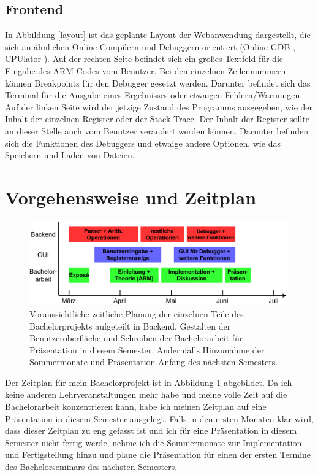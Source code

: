 \documentclass[a4paper, 11pt, onecolumn]{article}
\begin{document}
\subsection{Frontend}

In Abbildung \ref{layout} ist das geplante Layout der Webanwendung dargestellt, die sich an ähnlichen Online Compilern und Debuggern orientiert (Online GDB \cite{onlinegdb}, CPUlator \cite{cpulator}). Auf der rechten Seite befindet sich ein großes Textfeld für die Eingabe des ARM-Codes vom Benutzer. Bei den einzelnen Zeilennummern können Breakpoints für den Debugger gesetzt werden. Darunter befindet sich das Terminal für die Ausgabe eines Ergebnisses oder etwaigen Fehlern/Warnungen. Auf der linken Seite wird der jetzige Zustand des Programms ausgegeben, wie der Inhalt der einzelnen Register oder der Stack Trace. Der Inhalt der Register sollte an dieser Stelle auch vom Benutzer verändert werden können. Darunter befinden sich die Funktionen des Debuggers und etwaige andere Optionen, wie das Speichern und Laden von Dateien.


\section{Vorgehensweise und Zeitplan}

\begin{figure}[!htb]	
	\includegraphics[width=0.8\paperwidth]{data/timeline}
	\caption{Voraussichtliche zeitliche Planung der einzelnen Teile des Bachelorprojekts aufgeteilt in Backend, Gestalten der Benutzeroberfläche und Schreiben der Bachelorarbeit für Präsentation in diesem Semester. Andernfalls Hinzunahme der Sommermonate und Präsentation Anfang des nächsten Semesters.}
	\label{timeline}
\end{figure}

Der Zeitplan für mein Bachelorprojekt ist in Abbildung \ref{timeline} abgebildet. Da ich keine anderen Lehrveranstaltungen mehr habe und meine volle Zeit auf die Bachelorarbeit konzentrieren kann, habe ich meinen Zeitplan auf eine Präsentation in diesem Semester ausgelegt. Falls in den ersten Monaten klar wird, dass dieser Zeitplan zu eng gefasst ist und ich für eine Präsentation in diesem Semester nicht fertig werde, nehme ich die Sommermonate zur Implementation und Fertigstellung hinzu und plane die Präsentation für einen der ersten Termine des Bachelorseminars des nächsten Semesters.
\end{document}
